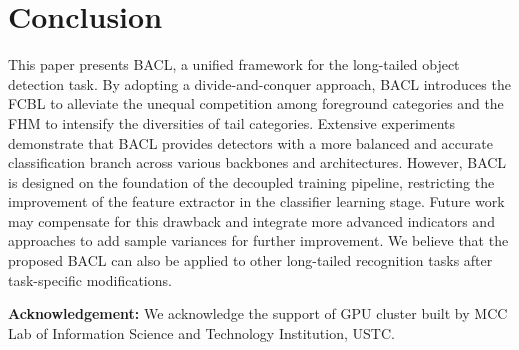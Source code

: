 \documentclass[lettersize,journal]{IEEEtran}
\begin{document}
\vspace{-2mm}
\section{Conclusion}
This paper presents BACL, a unified framework for the long-tailed object detection task.
By adopting a divide-and-conquer approach, BACL introduces the FCBL to alleviate the unequal competition among foreground categories and the FHM to intensify the diversities of tail categories.
Extensive experiments demonstrate that BACL provides detectors with a more balanced and accurate classification branch across various backbones and architectures.
However, BACL is designed on the foundation of the decoupled training pipeline, restricting the improvement of the feature extractor in the classifier learning stage.
Future work may compensate for this drawback and integrate more advanced indicators and approaches to add sample variances for further improvement.
We believe that the proposed BACL can also be applied to other long-tailed recognition tasks after task-specific modifications.

\noindent\textbf{Acknowledgement:} We acknowledge the support of GPU cluster built by MCC Lab of Information Science and Technology Institution, USTC.


\vspace{-3mm}



\vfill
\end{document}
